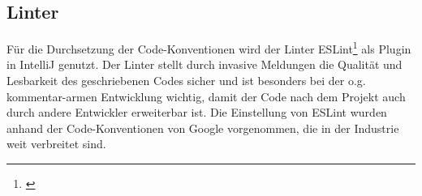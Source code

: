 \subsection*{Linter}
Für die Durchsetzung der Code-Konventionen wird der Linter ESLint\footnote{\cite{ESLint.2020}} als Plugin in IntelliJ genutzt.
Der Linter stellt durch invasive Meldungen die Qualität und Lesbarkeit des geschriebenen Codes sicher und ist besonders bei der o.g. kommentar-armen Entwicklung wichtig, damit der Code nach dem Projekt auch durch andere Entwickler erweiterbar ist.
Die Einstellung von ESLint wurden anhand der Code-Konventionen von Google vorgenommen, die in der Industrie weit verbreitet sind.
